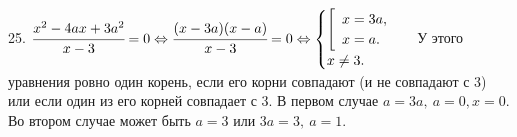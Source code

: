 25. $\cfrac{x^2-4ax+3a^2}{x-3}=0\Leftrightarrow\cfrac{(x-3a)(x-a)}{x-3}=0\Leftrightarrow\begin{cases}\left[\begin{array}{l}x=3a,\\ x=a.\end{array}\right.\\x\neq3.\end{cases}$ У этого уравнения ровно один корень, если его корни совпадают (и не совпадают с 3) или если один из его корней совпадает с 3. В первом случае $a=3a,\ a=0, x=0.$ Во втором случае может быть $a=3$ или $3a=3,\ a=1.$\\
